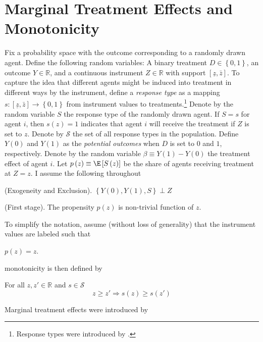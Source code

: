 \section{Marginal Treatment Effects and Monotonicity\label{sec:theory}}

Fix a probability space with the outcome corresponding to a randomly
drawn agent. Define the following random variables: A binary treatment
$D\in\left\{ 0,1\right\} $, an outcome $Y\in\mathbb{R}$, and a continuous
instrument $Z\in\mathbb{R}$ with support $\left[\underline{z},\bar{z}\right]$.
To capture the idea that different agents might be induced into treatment
in different ways by the instrument, define a \emph{response type}
as a mapping $s:\left[\underline{z},\bar{z}\right]\rightarrow\left\{ 0,1\right\} $
from instrument values to treatments.\footnote{Response types were introduced by \citet{heckman2018unordered}.}
Denote by the random variable $S$ the response type of the randomly
drawn agent. If $S=s$ for agent $i$, then $s\left(z\right)=1$ indicates
that agent $i$ will receive the treatment if $Z$ is set to $z$.
 Denote by $\mathcal{S}$ the set of all response types in the population.
Define $Y\left(0\right)$ and $Y\left(1\right)$ as the \emph{potential
outcomes} when $D$ is set to $0$ and $1$, respectively. Denote
by the random variable $\beta\equiv Y\left(1\right)-Y\left(0\right)$
the treatment effect of agent $i$. Let $p\left(z\right)\equiv\E\left[S\left(z\right)\right]$
be the share of agents receiving treatment at $Z=z$. I assume the
following throughout
\begin{assumption}
\label{assu:iv}(Exogeneity and Exclusion). $\left\{ Y\left(0\right),Y\left(1\right),S\right\} \perp Z$
\end{assumption}
\begin{assumption}
\label{assu:rank}(First stage). The propensity $p\left(z\right)$
is non-trivial function of $z$.
\end{assumption}
To simplify the notation, assume (without loss of generality) that
the instrument values are labeled such that
\begin{assumption}
\label{assu:indexed_by_stringency-1-1} $p\left(z\right)=z$.
\end{assumption}
\citet{Imbens1994Identification} monotonicity is then defined by
\begin{defn}
 For all $z,z'\in\mathbb{R}$ and $s\in\mathcal{S}$
\[
z\geq z'\Rightarrow s\left(z\right)\geq s\left(z'\right)
\]
\end{defn}
Marginal treatment effects were introduced by \citet{bjorklund1987estimation}

